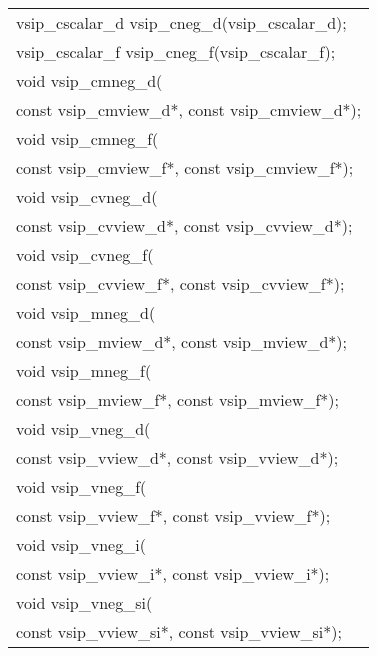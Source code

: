 \\\cvsiplh
\afh
\\\hspace*{.04\textwidth} {
\ttfamily
\begin{tabular}[H]{l}
vsip\_cscalar\_d vsip\_cneg\_d(vsip\_cscalar\_d);\\
vsip\_cscalar\_f vsip\_cneg\_f(vsip\_cscalar\_f);\\
void vsip\_cmneg\_d(\\*\hspace{.6cm}const vsip\_cmview\_d*, const vsip\_cmview\_d*);\\
void vsip\_cmneg\_f(\\*\hspace{.6cm}const vsip\_cmview\_f*, const vsip\_cmview\_f*);\\
void vsip\_cvneg\_d(\\*\hspace{.6cm}const vsip\_cvview\_d*, const vsip\_cvview\_d*);\\
void vsip\_cvneg\_f(\\*\hspace{.6cm}const vsip\_cvview\_f*, const vsip\_cvview\_f*);\\
void vsip\_mneg\_d(\\*\hspace{.6cm}const vsip\_mview\_d*, const vsip\_mview\_d*);\\
void vsip\_mneg\_f(\\*\hspace{.6cm}const vsip\_mview\_f*, const vsip\_mview\_f*);\\
void vsip\_vneg\_d(\\*\hspace{.6cm}const vsip\_vview\_d*, const vsip\_vview\_d*);\\
void vsip\_vneg\_f(\\*\hspace{.6cm}const vsip\_vview\_f*, const vsip\_vview\_f*);\\
void vsip\_vneg\_i(\\*\hspace{.6cm}const vsip\_vview\_i*, const vsip\_vview\_i*);\\
void vsip\_vneg\_si(\\*\hspace{.6cm}const vsip\_vview\_si*, const vsip\_vview\_si*);\\
\end{tabular}
}
\\\pyjvsiph